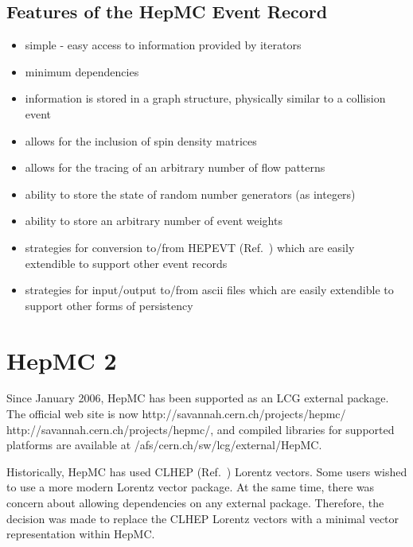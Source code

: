 \documentclass[11pt,letterpaper]{article}
\begin{document}
%
%

\subsection{Features of the HepMC Event Record}

\begin{itemize}\setlength{\itemsep}{0pt}
\item simple - easy access to information provided by iterators
\item minimum dependencies
\item information is stored in a graph structure, 
  physically similar to a collision event
\item allows for the inclusion of spin density matrices 
\item allows for the tracing of an arbitrary number of flow patterns
\item ability to store the state of random number generators (as
  integers)
\item ability to store an arbitrary number of event weights
\item strategies for conversion to/from HEPEVT (Ref.~\cite{Boos:2001cv}) 
  which are easily extendible to support other event records
\item strategies for input/output to/from ascii files which
  are easily extendible to support other forms of persistency
\end{itemize}

%
%

\section{HepMC 2}

Since January 2006, HepMC has been supported as an LCG external package.
The official web site is now \htmladdnormallink 
{http://savannah.cern.ch/projects/hepmc/} 
{http://savannah.cern.ch/projects/hepmc/}, 
and compiled libraries for supported platforms are available at 
/afs/cern.ch/sw/lcg/external/HepMC.

Historically, HepMC has used CLHEP (Ref.~\cite{clhep}) Lorentz vectors.  Some users wished to use
a more modern Lorentz vector package.  At the same time, 
there was concern about allowing dependencies on any external package.  
Therefore, the decision was made to replace the CLHEP Lorentz vectors with
a minimal vector representation within HepMC.  
\end{document}
